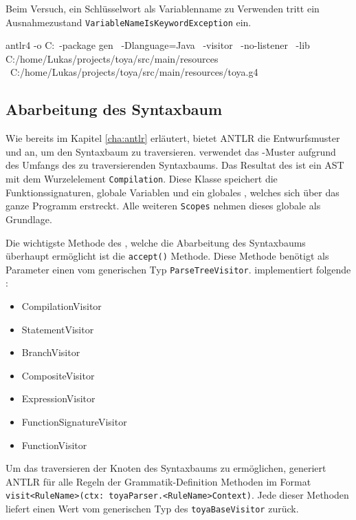 Beim Versuch, ein Schlüsselwort als Variablenname zu Verwenden tritt ein Ausnahmezustand \texttt{VariableNameIsKeywordException} ein. 

\begin{ToyaCode}[numbers=none, caption={Befehl zur Erzeugung der Visitor-Klassen für \toya}]
antlr4 -o C:\home\Lukas\projects\toya\src\main\java\gen \
    -package gen \
    -Dlanguage=Java \
    -visitor \
    -no-listener \
    -lib C:/home/Lukas/projects/toya/src/main/resources \
    C:/home/Lukas/projects/toya/src/main/resources/toya.g4
\end{ToyaCode}

\subsection{Abarbeitung des Syntaxbaum}

Wie bereits im Kapitel \ref{cha:antlr} erläutert, bietet ANTLR die Entwurfsmuster \visitor und \listener an, um den Syntaxbaum zu traversieren. \Toya verwendet das \visitor-Muster aufgrund des Umfangs des zu traversierenden Syntaxbaums. Das Resultat des \visitors ist ein AST mit dem Wurzelelement \texttt{Compilation}. Diese Klasse speichert die Funktionssignaturen, globale Variablen und ein globales \scope, welches sich über das ganze Programm erstreckt. Alle weiteren \texttt{Scopes} nehmen dieses globale \scope als Grundlage. 

Die wichtigste Methode des \visitor, welche die Abarbeitung des Syntaxbaums überhaupt ermöglicht ist die \texttt{accept()} Methode. Diese Methode benötigt als Parameter einen \visitor vom generischen Typ \texttt{ParseTreeVisitor}. \Toya implementiert folgende \visitor:

\begin{itemize}
    \item CompilationVisitor
    \item StatementVisitor
    \item BranchVisitor
    \item CompositeVisitor
    \item ExpressionVisitor
    \item FunctionSignatureVisitor
    \item FunctionVisitor
\end{itemize}

Um das traversieren der Knoten des Syntaxbaums zu ermöglichen, generiert ANTLR für alle Regeln der Grammatik-Definition Methoden im Format \texttt{visit<RuleName>(ctx: toyaParser.<RuleName>Context)}. Jede dieser Methoden liefert einen Wert vom generischen Typ des \texttt{toyaBaseVisitor} zurück.

